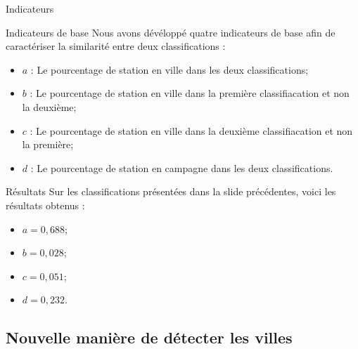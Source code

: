 \begin{frame}{Indicateurs}
    \begin{block}{Indicateurs de base}
        Nous avons dévéloppé quatre indicateurs de base afin de caractériser la similarité entre deux classifications :
        \begin{itemize}
            \item $a$ : Le pourcentage de station en ville dans les deux classifications;
            \item $b$ : Le pourcentage de station en ville dans la première classifiacation et non la deuxième;
            \item $c$ : Le pourcentage de station en ville dans la deuxième classifiacation et non la première;
            \item $d$ : Le pourcentage de station en campagne dans les deux classifications.
        \end{itemize}
    \end{block}
    \begin{block}{Résultats}
        Sur les classifications présentées dans la slide précédentes, voici les résultats obtenus : 
        \begin{itemize}
            \item $a = 0,688$;
            \item $b = 0,028$;
            \item $c = 0,051$;
            \item $d = 0,232$.
        \end{itemize}
    \end{block}
\end{frame}


\subsection{Nouvelle manière de détecter les villes}
\insertsubsectionframe

